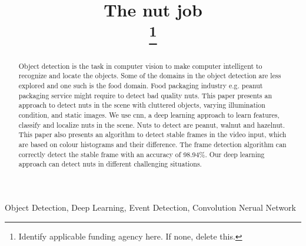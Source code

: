 \documentclass[journal,onecolumn,12pt]{IEEEtran}
\begin{document}
\title{The nut job\\
{\footnotesize }%
\thanks{Identify applicable funding agency here. If none, delete this.}
}

\author{
}

\maketitle

\begin{abstract}
Object detection is the task in computer vision to make computer intelligent to recognize and locate the objects. Some of the domains in the object detection are less explored and one such is the food domain. Food packaging industry e.g. peanut packaging service might require to detect bad quality nuts. This paper presents an approach to detect nuts in the scene with cluttered objects, varying illumination condition, and static images. We use \gls{cnn}, a deep learning approach to learn features, classify and localize nuts in the scene. Nuts to detect are peanut, walnut and hazelnut. This paper also presents an algorithm to detect stable frames in the video input, which are based on colour histograms and their difference. The frame detection algorithm can correctly detect the stable frame with an accuracy of 98.94\%. Our deep learning approach can detect nuts in different challenging situations.
\end{abstract}

\begin{IEEEkeywords}
Object Detection, Deep Learning, Event Detection, Convolution Nerual Network
\end{IEEEkeywords}
\end{document}
